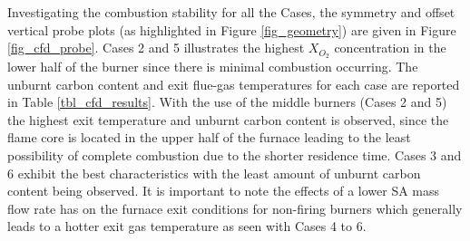 \documentclass[review]{elsarticle}
\begin{document}
Investigating the combustion stability for all the Cases, the symmetry and offset vertical probe plots (as highlighted in Figure \ref{fig_geometry}) are given in Figure \ref{fig_cfd_probe}. Cases 2 and 5 illustrates the highest $X_{O_{2}}$ concentration in the lower half of the burner since there is minimal combustion occurring. The unburnt carbon content and exit flue-gas temperatures for each case are reported in Table \ref{tbl_cfd_results}. With the use of the middle burners (Cases 2 and 5) the highest exit temperature and unburnt carbon content is observed, since the flame core is located in the upper half of the furnace leading to the least possibility of complete combustion due to the shorter residence time. Cases 3 and 6 exhibit the best characteristics with the least amount of unburnt carbon content being observed. It is important to note the effects of a lower SA mass flow rate has on the furnace exit conditions for non-firing burners which generally leads to a hotter exit gas temperature as seen with Cases 4 to 6. 
\end{document}
